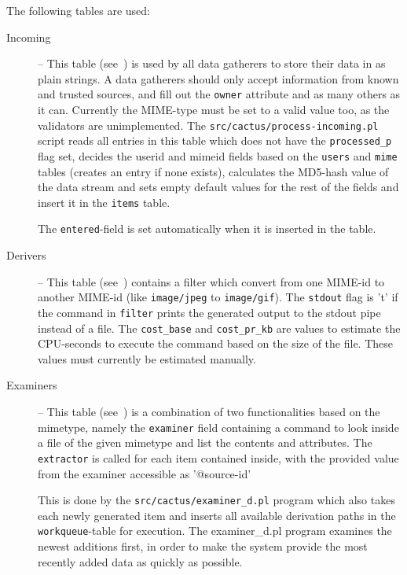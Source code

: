 The following tables are used:


\begin{description}

\item[Incoming] -- This table (see~) is used
by all data gatherers to store their data in as plain strings.  A data
gatherers should only accept information from known and trusted
sources, and fill out the \texttt{owner} attribute and as many others
as it can.  Currently the MIME-type must be set to a valid value too,
as the validators are unimplemented.  The
\texttt{src/cactus/process-incoming.pl} script reads all entries in
this table which does not have the \texttt{processed\_p} flag set,
decides the userid and mimeid fields based on the \texttt{users} and
\texttt{mime} tables (creates an entry if none exists), calculates the
MD5-hash value of the data stream and sets empty default values for
the rest of the fields and insert it in the \texttt{items} table.

  The \texttt{entered}-field is set automatically when it is inserted
  in the table.



%  

\item[Derivers] -- This table (see~) contains
  a filter which convert from one MIME-id to another MIME-id (like
  \texttt{image/jpeg} to \texttt{image/gif}).  The \texttt{stdout}
  flag is 't' if the command in \texttt{filter} prints the generated
  output to the stdout pipe instead of a file.  The
  \texttt{cost\_base} and \texttt{cost\_pr\_kb} are values to estimate
  the CPU-seconds to execute the command based on the size of the
  file.  These values must currently be estimated manually.



\item[Examiners] -- This table (see~) is a
combination of two functionalities based on the mimetype, namely the
\texttt{examiner} field containing a command to look inside a file of
the given mimetype and list the contents and attributes.  The
\texttt{extractor} is called for each item contained inside, with the
provided value from the examiner accessible as '{@source-id}'

This is done by the \texttt{src/cactus/examiner\_d.pl} program which
also takes each newly generated item and inserts all available
derivation paths in the \texttt{workqueue}-table for execution.  The
examiner\_d.pl program examines the newest additions first, in order
to make the system provide the most recently added data as quickly as
possible.


\end{description}
